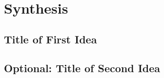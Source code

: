 \section{Synthesis}



\subsection{Title of First Idea}


\subsection{Optional: Title of Second Idea}



